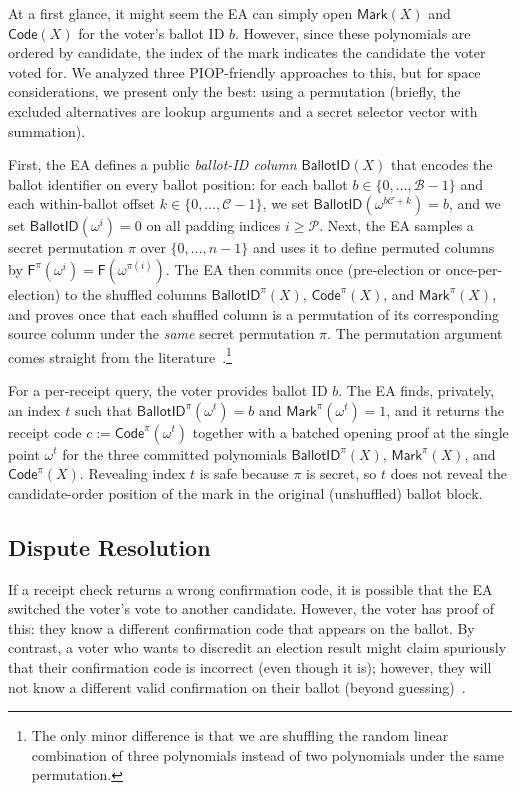 At a first glance, it might seem the EA can simply open $\mathsf{Mark}(X)$ and $\mathsf{Code}(X)$ for the voter's ballot ID $b$. However, since these polynomials are ordered by candidate, the index of the mark indicates the candidate the voter voted for. We analyzed three PIOP-friendly approaches to this, but for space considerations, we present only the best: using a permutation (briefly, the excluded alternatives are lookup arguments and a secret selector vector with summation).

First, the EA defines a public \emph{ballot-ID column} $\mathsf{BallotID}(X)$ that encodes the ballot identifier on every ballot position: for each ballot $b\in\{0,\dots,\mathcal{B}-1\}$ and each within-ballot offset $k\in\{0,\dots,\mathcal{C}-1\}$, we set $\mathsf{BallotID}(\omega^{b\mathcal{C}+k})=b$, and we set $\mathsf{BallotID}(\omega^i)=0$ on all padding indices $i\ge \mathcal{P}$. Next, the EA samples a secret permutation $\pi$ over $\{0,\dots,n-1\}$ and uses it to define permuted columns by $\mathsf{F}^{\pi}(\omega^i)=\mathsf{F}(\omega^{\pi(i)})$. The EA then commits once (pre-election or once-per-election) to the shuffled columns $\mathsf{BallotID}^{\pi}(X)$, $\mathsf{Code}^{\pi}(X)$, and $\mathsf{Mark}^{\pi}(X)$, and proves once that each shuffled column is a permutation of its corresponding source column under the \emph{same} secret permutation $\pi$. The permutation argument comes straight from the literature~\cite{GWC19}.\footnote{The only minor difference is that we are shuffling the random linear combination of three polynomials instead of two polynomials under the same permutation.}

For a per-receipt query, the voter provides ballot ID $b$. The EA finds, privately, an index $t$ such that $\mathsf{BallotID}^{\pi}(\omega^t)=b$ and $\mathsf{Mark}^{\pi}(\omega^t)=1$, and it returns the receipt code $c:=\mathsf{Code}^{\pi}(\omega^t)$ together with a batched opening proof at the single point $\omega^t$ for the three committed polynomials $\mathsf{BallotID}^{\pi}(X)$, $\mathsf{Mark}^{\pi}(X)$, and $\mathsf{Code}^{\pi}(X)$. Revealing index $t$ is safe because $\pi$ is secret, so $t$ does not reveal the candidate-order position of the mark in the original (unshuffled) ballot block.

\subsection{Dispute Resolution}
\label{sec:dispute}

If a receipt check returns a wrong confirmation code, it is possible that the EA switched the voter's vote to another candidate. However, the voter has proof of this: they know a different confirmation code that appears on the ballot. By contrast, a voter who wants to discredit an election result might claim spuriously that their confirmation code is incorrect (even though it is); however, they will not know a different valid confirmation on their ballot (beyond guessing)~\cite{CCC+08}.

